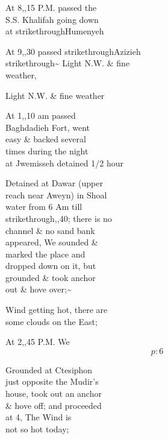 \documentclass{report}
\begin{document}
	\par{
 	At 8,,15 P.M. passed the\ \\S.S. Khalifah going down\ \\at \lbrack strikethrough\rbrack Humenyeh\ \\
	}

	\par{
 	At 9,,30 passed \lbrack strikethrough\rbrack Azizieh\ \\\lbrack strikethrough\rbrack \~{} Light N.W. \& fine\ \\weather,\ \\
	}

	\par{
 	Light N.W. \& fine weather\ \\
	}

	\par{
 	At 1,,10 am passed\ \\Baghdadieh Fort, went\ \\easy \& backed several\ \\times during the night\ \\at Jwemisseh detained 1/2 hour\ \\
	}

	\par{
 	Detained at Dawar (upper\ \\reach near Aweyn) in Shoal\ \\water from 6 Am till\ \\\lbrack strikethrough,,40; there is no\ \\channel \& no sand bank\ \\appeared, We sounded \&\ \\marked the place and\ \\dropped down on it, but\ \\grounded \& took anchor\ \\out \& hove over;\~{}\ \\
	}

	\par{
 	Wind getting hot, there are\ \\some clouds on the East;\ \\
	}

	\par{
 	At 2,,45 P.M. We\ \\
  \[p: 6 \]

	}

	\par{
 	Grounded at Ctesiphon\ \\just opposite the Mudir's\ \\house, took out an anchor\ \\\& hove off; and proceeded\ \\at 4, The Wind is\ \\not so hot today;\ \\
	}
\end{document}
